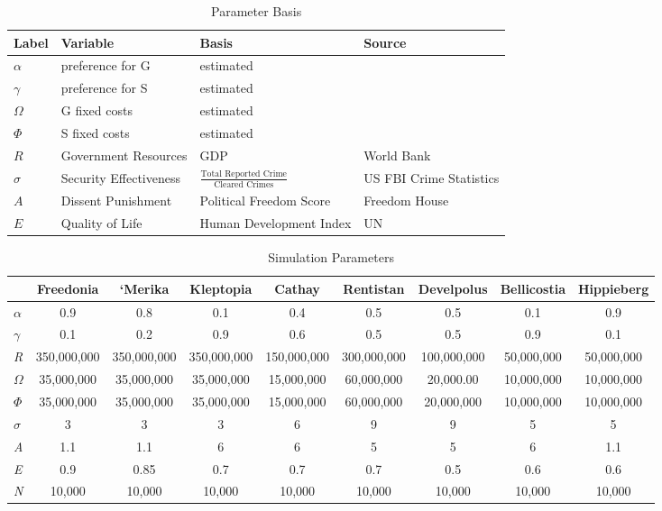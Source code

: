 \documentclass[12pt]{article}
\begin{document}
\begin{spacing}{1.5}
\begin{table}[]
\centering
\begin{tiny}
\caption{Parameter Basis}
\begin{tabular}{llll}
\toprule
\textbf{Label} & \textbf{Variable} & \textbf{Basis} & \textbf{Source} \\ \hline
\textbf{$\alpha$} & preference for G & estimated &  \\
\textbf{$\gamma$} & preference for S & estimated &  \\
\textbf{$\Omega$} & G fixed costs & estimated &  \\
\textbf{$\Phi$} & S fixed costs & estimated &  \\
\textbf{$R$} & Government Resources & GDP & World Bank \\
\textbf{$\sigma$} & Security Effectiveness & $\frac{\text{Total Reported Crime}}{\text{Cleared Crimes}}$ & US FBI Crime Statistics \\
\textbf{$A$} & Dissent Punishment & Political Freedom Score & Freedom House \\
\textbf{$E$} & Quality of Life & Human Development Index & UN \\ \hline
\end{tabular}
\end{tiny}
\end{table}

\begin{table}[]
\centering
\begin{tiny}
\caption{Simulation Parameters}
\begin{tabular}{lcccccccc}
\toprule
\multicolumn{1}{l}{} & \textbf{Freedonia} & \textbf{‘Merika} & \textbf{Kleptopia} & \textbf{Cathay} & \textbf{Rentistan} & \textbf{Develpolus} & \textbf{Bellicostia} & \textbf{Hippieberg} \\ \hline
\textit{$\alpha$} & 0.9 & 0.8 & 0.1 & 0.4 & 0.5 & 0.5 & 0.1 & 0.9 \\
\textit{$\gamma$} & 0.1 & 0.2 & 0.9 & 0.6 & 0.5 & 0.5 & 0.9 & 0.1 \\
\textit{R} & 350,000,000 & 350,000,000 & 350,000,000 & 150,000,000 & 300,000,000 & 100,000,000 & 50,000,000 & 50,000,000 \\
\textit{$\Omega$} & 35,000,000 & 35,000,000 & 35,000,000 & 15,000,000 & 60,000,000 & 20,000.00 & 10,000,000 & 10,000,000 \\
\textit{$\Phi$} & 35,000,000 & 35,000,000 & 35,000,000 & 15,000,000 & 60,000,000 & 20,000,000 & 10,000,000 & 10,000,000 \\
\textit{$\sigma$} & 3 & 3 & 3 & 6 & 9 & 9 & 5 & 5 \\
\textit{A} & 1.1 & 1.1 & 6 & 6 & 5 & 5 & 6 & 1.1 \\
\textit{E} & 0.9 & 0.85 & 0.7 & 0.7 & 0.7 & 0.5 & 0.6 & 0.6 \\
\textit{N} & 10,000 & 10,000 & 10,000 & 10,000 & 10,000 & 10,000 & 10,000 & 10,000 \\ \hline
\end{tabular}
\end{tiny}
\end{table}


\end{spacing}
\end{document}
